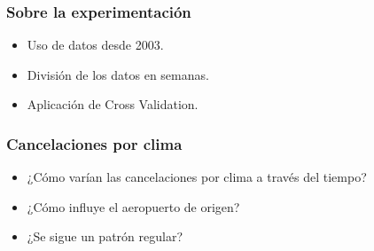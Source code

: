 \documentclass{beamer}
\begin{document}

\begin{frame}





\frametitle{Sobre la experimentación}
\begin{itemize}
    \item{Uso de datos desde 2003.}
    \item{División de los datos en semanas.}
    \item{Aplicación de Cross Validation.}
\end{itemize}

\end{frame}





\begin{frame}


\frametitle{Cancelaciones por clima}

\begin{itemize}
    \item{¿Cómo varían las cancelaciones por clima a través del tiempo?}
    \item{¿Cómo influye el aeropuerto de origen?}
    \item{¿Se sigue un patrón regular?}
\end{itemize}

\end{frame}

\end{document}
